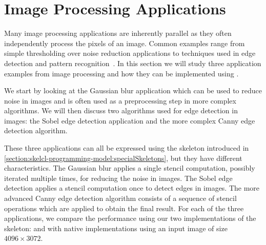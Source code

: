 \section{Image Processing Applications}
\label{sec:imageProcessing}
Many image processing applications are inherently parallel as they often independently process the pixels of an image.
Common examples range from simple thresholding over noise reduction applications to techniques used in edge detection and pattern recognition~\cite{Umbaugh1997}.
In this section we will study three application examples from image processing and how they can be implemented using \SkelCL.

We start by looking at the Gaussian blur application which can be used to reduce noise in images and is often used as a preprocessing step in more complex algorithms.
We will then discuss two algorithms used for edge detection in images:
the Sobel edge detection application and the more complex Canny edge detection algorithm.

These three applications can all be expressed using the \stencil skeleton introduced in \autoref{section:skelcl-programming-model:specialSkeletons}, but they have different characteristics.
The Gaussian blur applies a single stencil computation, possibly iterated multiple times, for reducing the noise in images.
The Sobel edge detection applies a stencil computation once to detect edges in images.
The more advanced Canny edge detection algorithm consists of a sequence of stencil operations which are applied to obtain the final result.
For each of the three applications, we compare the performance using our two implementations of the \stencil skeleton:
 and  with native \OpenCL implementations using an input image of size $4096 \times 3072$.










